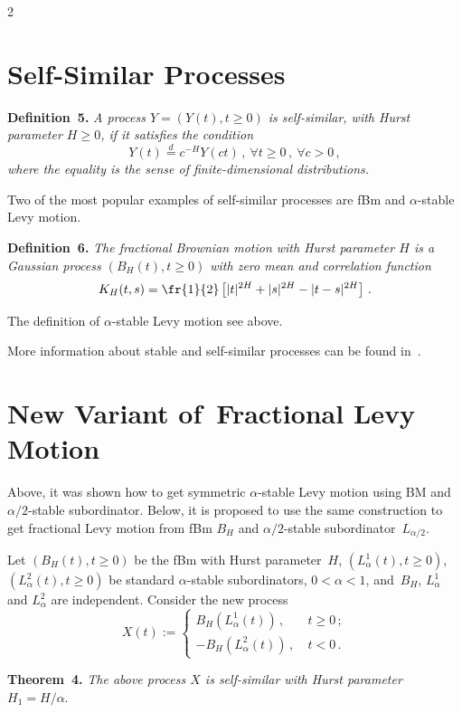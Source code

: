 \begin{multicols}{2}
\section{Self-Similar Processes} 


\noindent
\textbf{Definition~5.} 
\textit{A process $Y = (Y(t), t\geq 0)$ is self-similar, with Hurst parameter $H\geq 0$, if it 
satisfies the condition 
$$
Y(t) \stackrel{d}{=} c^{-H} Y(ct)\,, \ \forall t\geq 0\,, \ \forall c>0\,,
$$
where the equality is the sense of finite-dimensional distributions.}

\smallskip

Two of the most popular examples of self-similar processes are 
fBm and $\alpha$-stable Levy motion. 

\smallskip

\noindent
\textbf{Definition~6.}
\textit{The fractional Brownian motion with Hurst parameter $H$ is a Gaussian process 
$(B_H (t), t\geq 0)$ with zero mean and correlation function}
$$
K_H (t,s) = \fr{1}{2} \left[ |t|^{2H} + |s|^{2H} - |t-s|^{2H} \right] \,.
$$ 

\smallskip

The definition of $\alpha$-stable Levy motion see above. 

More information about stable and self-similar processes can be found in~\cite{18-nik, 19-nik}. 

\section{New Variant of~Fractional Levy Motion}

\noindent
Above, it was shown  how to get symmetric $\alpha$-stable Levy motion using 
BM and $\alpha/2$-stable subordinator. Below, it is proposed to use the same 
construction to get fractional Levy motion from fBm $B_H$ and 
$\alpha/2$-stable subordinator~$L_{\alpha/2}$. 

Let $(B_H (t), t\geq 0)$ be the fBm with Hurst parameter~$H$,  
$(L_{\alpha}^1 (t), t\geq 0)$, $(L_{\alpha}^2 (t), t\geq 0)$  be standard $\alpha$-stable 
subordinators, $0<\alpha < 1$, and~$B_H$, $L_{\alpha}^1$ and 
$L_{\alpha}^2$ are independent. Consider the new process 
$$
X(t) := 
\begin{cases}
B_H (L_{\alpha}^1 (t))\,, &\ t\geq 0 \,; \\[6pt]
- B_H (L_{\alpha}^2 (t))\,, &\  t < 0 \,. 
\end{cases}
$$

\noindent
\textbf{Theorem~4.} \textit{The above process $X$ is self-similar with Hurst parameter 
$H_1 = H/\alpha$}. 


\end{multicols}
